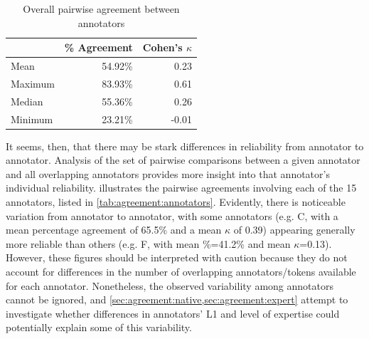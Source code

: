 		\begin{table}[b]
			\centering
			\caption{Overall pairwise agreement between annotators}
			\begin{tabular}{lrr}
			\toprule
				&	\% Agreement	&	Cohen's $\kappa$	\\
			\midrule
Mean		&	54.92\%	&	0.23	\\
Maximum	&	83.93\%	&	0.61	\\
Median		&	55.36\%	&	0.26	\\
Minimum	&	23.21\%	&	-0.01	\\
			\bottomrule
			\end{tabular}						
			
			\label{tab:agreement:overall}
		\end{table}
	
	
	It seems, then, that there may be stark differences in reliability from annotator to annotator. Analysis of the set of pairwise comparisons between a given annotator and all overlapping annotators provides more insight into that annotator's individual reliability. 
	 illustrates the pairwise agreements involving each of the 15 annotators, listed in \cref{tab:agreement:annotators}.
	 Evidently, there is noticeable variation from annotator to annotator, with some annotators (e.g. C, with a mean percentage agreement of 65.5\% and a mean $\kappa$ of 0.39) appearing generally more reliable than others (e.g. F, with mean \%=41.2\% and mean $\kappa$=0.13).  
	 However, these figures should be interpreted with caution because they do not account for differences in the number of overlapping annotators/tokens available for each annotator. %
	Nonetheless, the observed variability among annotators cannot be ignored, and \cref{sec:agreement:native,sec:agreement:expert} attempt to investigate whether differences in annotators' L1 and level of expertise could potentially explain some of this variability.
		
